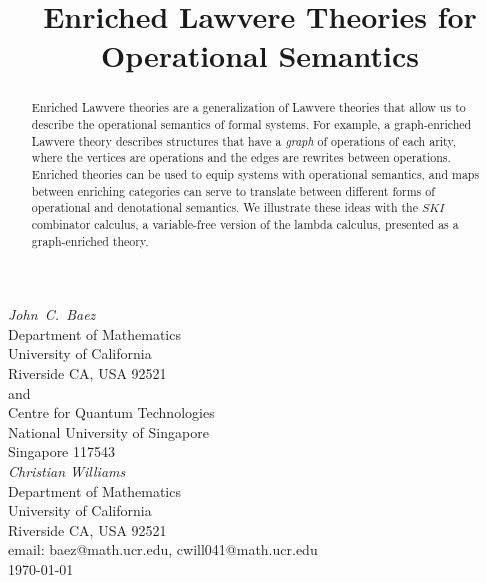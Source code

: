 \documentclass{amsart}
\theoremstyle{definition}
\begin{document}
\title{Enriched Lawvere Theories 
for Operational Semantics \\}

\maketitle
\begin{center}   
  {\em John\ C.\ Baez \\}
  \vspace{0.3cm}
  {\small
 Department of Mathematics \\
    University of California \\
  Riverside CA, USA 92521 \\ and \\
 Centre for Quantum Technologies  \\
    National University of Singapore \\
    Singapore 117543  \\    } 
  \vspace{0.4cm}
{\em Christian Williams \\}
\vspace{0.3cm}
   {\small
   Department of Mathematics \\
  University of California \\
  Riverside CA, USA 92521 \\}
  \vspace{0.3cm}   
  {\small email:  baez@math.ucr.edu, cwill041@math.ucr.edu\\} 
  \vspace{0.3cm}   
  {\small \today}
  \vspace{0.3cm}   
\end{center} 

\begin{abstract} 
Enriched Lawvere theories are a generalization of Lawvere theories that allow us to describe the operational semantics of formal systems.  For example, a graph-enriched Lawvere theory describes structures that have a \emph{graph} of operations of each arity, where the vertices are operations and the edges are rewrites between operations. Enriched theories can be used to equip systems with operational semantics, and maps between enriching categories can serve to translate between different forms of operational and denotational semantics.  We illustrate these ideas with the $SKI$ combinator calculus, a variable-free version of the lambda calculus, presented as a graph-enriched theory.  
\end{abstract}
\end{document}

